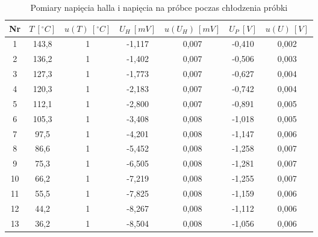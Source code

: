 \documentclass[12pt]{article}
\begin{document}
\begin{table}[H]
    \centering
    \begin{tabular}{c|cc|cc|cc}
        \toprule
        Nr & $T \ [^\circ C]$ & $u(T) \ [^\circ C]$ & $U_H \ [mV]$ & $u(U_H) \ [mV]$ & $U_P \ [V]$ & $u(U) \ [V]$ \\
        \midrule
        1  & 143{,}8 & 1 & -1{,}117 & 0{,}007 & -0{,}410 & 0{,}002 \\
        2  & 136{,}2 & 1 & -1{,}402 & 0{,}007 & -0{,}506 & 0{,}003 \\
        3  & 127{,}3 & 1 & -1{,}773 & 0{,}007 & -0{,}627 & 0{,}004 \\
        4  & 120{,}3 & 1 & -2{,}183 & 0{,}007 & -0{,}742 & 0{,}004 \\
        5  & 112{,}1 & 1 & -2{,}800 & 0{,}007 & -0{,}891 & 0{,}005 \\
        6  & 105{,}3 & 1 & -3{,}408 & 0{,}008 & -1{,}018 & 0{,}005 \\
        7  & 97{,}5  & 1 & -4{,}201 & 0{,}008 & -1{,}147 & 0{,}006 \\
        8  & 86{,}6  & 1 & -5{,}452 & 0{,}008 & -1{,}258 & 0{,}007 \\
        9  & 75{,}3  & 1 & -6{,}505 & 0{,}008 & -1{,}281 & 0{,}007 \\
        10 & 66{,}2  & 1 & -7{,}219 & 0{,}008 & -1{,}255 & 0{,}007 \\
        11 & 55{,}5  & 1 & -7{,}825 & 0{,}008 & -1{,}159 & 0{,}006 \\
        12 & 44{,}2  & 1 & -8{,}267 & 0{,}008 & -1{,}112 & 0{,}006 \\
        13 & 36{,}2  & 1 & -8{,}504 & 0{,}008 & -1{,}056 & 0{,}006 \\
        \bottomrule
    \end{tabular}
    \caption{Pomiary napięcia halla i napięcia na próbce poczas chłodzenia próbki}
    \label{tab:cooling_measurements}
\end{table}
\end{document}
